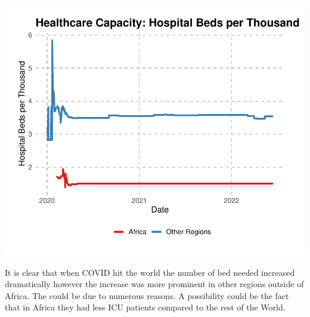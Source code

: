 \documentclass[12pt,preprint, authoryear]{elsarticle}
\let\origfigure\figure
\let\endorigfigure\endfigure
\renewenvironment{figure}[1][2] {
    \expandafter\origfigure\expandafter[H]
} {
    \endorigfigure
}
\numberwithin{equation}{section}
\numberwithin{figure}{section}
\numberwithin{table}{section}
\begin{document}
\begin{figure}

{\centering \includegraphics{Q1_files/figure-latex/Figure3-1} 

}

\caption{Hospital Beds \label{Figure3}}\label{fig:Figure3}
\end{figure}

It is clear that when COVID hit the world the number of bed needed
increased dramatically however the increase was more prominent in other
regions outside of Africa. The could be due to numerous reasons. A
possibility could be the fact that in Africa they had less ICU patients
compared to the rest of the World.

\begin{Shaded}
\begin{Highlighting}[]
\end{Highlighting}
\end{Shaded}
\end{document}
